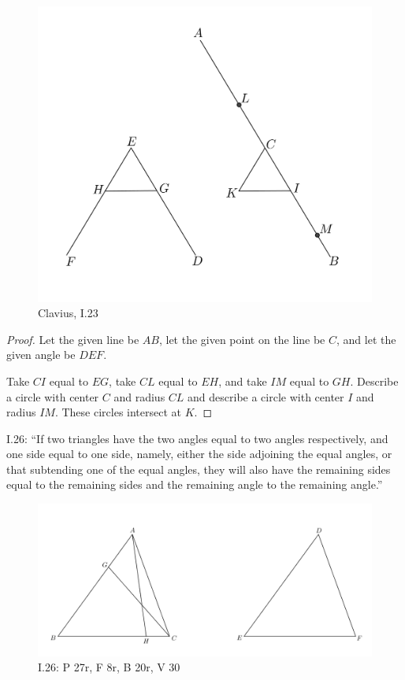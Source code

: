 \documentclass{article}
\begin{document}
\begin{figure}
\begin{center}
\includegraphics[width=\textwidth]{claviusI23.png}
\end{center}
\caption{Clavius, I.23}
\label{claviusI23}
\end{figure}

\begin{proof}
Let the given line be $AB$, let the given point on the line be $C$, and let the given
angle be $DEF$. 

Take $CI$ equal to $EG$, take $CL$ equal to $EH$, and take $IM$ equal to $GH$.
Describe a circle with center $C$ and radius $CL$ and describe a circle with center $I$ and radius $IM$. These circles intersect at $K$.
\end{proof}






I.26: ``If two triangles have the two angles equal to two angles
respectively, and one side equal to one side, namely, either the
side adjoining the equal angles, or that subtending one of the
equal angles, they will also have the remaining sides equal to
the remaining sides and the remaining angle to the remaining
angle.''

\begin{figure}
\begin{center}
\includegraphics[width=\textwidth]{I26.png}
\end{center}
\caption{I.26: P 27r, F 8r, B 20r, V 30}
\label{I26}
\end{figure}
\end{document}
